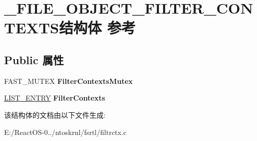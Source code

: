 \hypertarget{struct___f_i_l_e___o_b_j_e_c_t___f_i_l_t_e_r___c_o_n_t_e_x_t_s}{}\section{\+\_\+\+F\+I\+L\+E\+\_\+\+O\+B\+J\+E\+C\+T\+\_\+\+F\+I\+L\+T\+E\+R\+\_\+\+C\+O\+N\+T\+E\+X\+T\+S结构体 参考}
\label{struct___f_i_l_e___o_b_j_e_c_t___f_i_l_t_e_r___c_o_n_t_e_x_t_s}
\subsection*{Public 属性}
\begin{DoxyCompactItemize}
\item 
\mbox{\label{struct___f_i_l_e___o_b_j_e_c_t___f_i_l_t_e_r___c_o_n_t_e_x_t_s_a2caed623635121ccba532ada27c066c2}} 
F\+A\+S\+T\+\_\+\+M\+U\+T\+EX {\bfseries Filter\+Contexts\+Mutex}
\item 
\mbox{\label{struct___f_i_l_e___o_b_j_e_c_t___f_i_l_t_e_r___c_o_n_t_e_x_t_s_a8f5f6cc08c608cc8ef912bdef2d9b621}} 
\hyperlink{struct___l_i_s_t___e_n_t_r_y}{L\+I\+S\+T\+\_\+\+E\+N\+T\+RY} {\bfseries Filter\+Contexts}
\end{DoxyCompactItemize}


该结构体的文档由以下文件生成\+:\begin{DoxyCompactItemize}
\item 
E\+:/\+React\+O\+S-\/0../ntoskrnl/fsrtl/filtrctx.\+c\end{DoxyCompactItemize}
